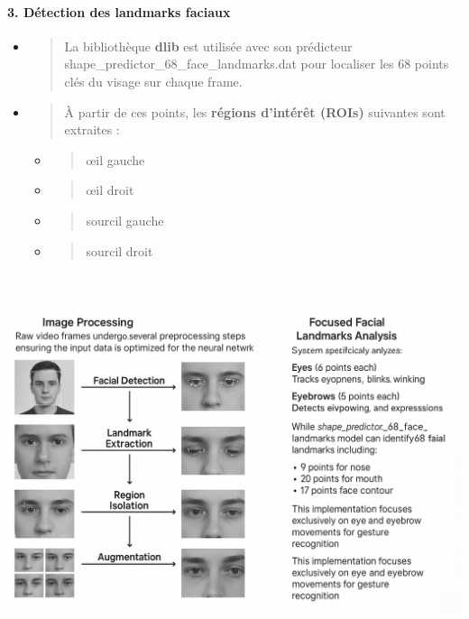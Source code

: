 \documentclass[
]{article}
\begin{document}
\hypertarget{duxe9tection-des-landmarks-faciaux}{%
\paragraph{\texorpdfstring{\textbf{3. Détection des landmarks faciaux}}{3. Détection des landmarks faciaux}}\label{duxe9tection-des-landmarks-faciaux}}

\begin{itemize}
\item
  \begin{quote}
  La bibliothèque \textbf{dlib} est utilisée avec son prédicteur shape\_predictor\_68\_face\_landmarks.dat pour localiser les 68 points clés du visage sur chaque frame.
  \end{quote}
\item
  \begin{quote}
  À partir de ces points, les \textbf{régions d'intérêt (ROIs)} suivantes sont extraites :
  \end{quote}

  \begin{itemize}
  \item
    \begin{quote}
    œil gauche
    \end{quote}
  \item
    \begin{quote}
    œil droit
    \end{quote}
  \item
    \begin{quote}
    sourcil gauche
    \end{quote}
  \item
    \begin{quote}
    sourcil droit
    \end{quote}
  \end{itemize}
\end{itemize}

\includegraphics[width=6.5in,height=4.33333in]{0528136f-968b-4a39-becd-3323677c0324_media/media/image3.png}
\end{document}
